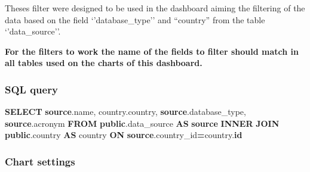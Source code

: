 \documentclass[
]{book}
\newenvironment{Shaded}{\begin{snugshade}}{\end{snugshade}}
\newcommand{\KeywordTok}[1]{\textcolor[rgb]{0.13,0.29,0.53}{\textbf{#1}}}
\newcommand{\NormalTok}[1]{#1}
\newcommand{\OperatorTok}[1]{\textcolor[rgb]{0.81,0.36,0.00}{\textbf{#1}}}
\begin{document}
Theses filter were designed to be used in the dashboard aiming the filtering of the data based on the field `'database\_type'' and ``country'' from the table `'data\_source''.

\textbf{For the filters to work the name of the fields to filter should match in all tables used on the charts of this dashboard.}

\hypertarget{sql-query}{%
\subsubsection*{SQL query}\label{sql-query}}

\begin{Shaded}
\begin{Highlighting}[]
\KeywordTok{SELECT} \KeywordTok{source}\NormalTok{.name,}
\NormalTok{       country.country,}
       \KeywordTok{source}\NormalTok{.database\_type,}
       \KeywordTok{source}\NormalTok{.acronym}
\KeywordTok{FROM} \KeywordTok{public}\NormalTok{.data\_source }\KeywordTok{AS} \KeywordTok{source}
\KeywordTok{INNER} \KeywordTok{JOIN} \KeywordTok{public}\NormalTok{.country }\KeywordTok{AS}\NormalTok{ country }\KeywordTok{ON} \KeywordTok{source}\NormalTok{.country\_id}\OperatorTok{=}\NormalTok{country.}\KeywordTok{id}
\end{Highlighting}
\end{Shaded}

\hypertarget{chart-settings}{%
\subsubsection*{Chart settings}\label{chart-settings}}
\end{document}
